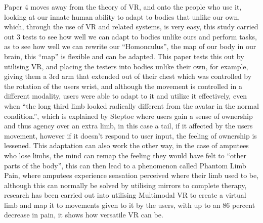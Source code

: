 \documentclass{scrartcl}
\begin{document}
Paper 4\cite{won2015homuncular} moves away from the theory of VR, and onto the people who use it, looking at our innate human ability to adapt to bodies that unlike our own, which, through the use of VR and related systems, is very easy, this study carried out 3 tests to see how well we can adapt to bodies unlike ours and perform tasks, as to see how well we can rewrite our ``Homonculus'', the map of our body in our brain, this ``map'' is flexible and can be adapted. This paper tests this out by utilising VR, and placing the testers into bodies unlike their own, for example, giving them a 3rd arm that extended out of their chest which was controlled by the rotation of the users wrist, and although the movement is controlled in a different modality, users were able to adapt to it and utilize it effectively, even when ``the long third limb looked radically different from the avatar in the normal condition.''\cite{won2015homuncular}, which is explained by Steptoe\cite{steptoe2013human} where users gain a sense of ownership and thus agency over an extra limb, in this case a tail, if it affected by the users movement, however if it doesn't respond to user input, the feeling of ownership is lessened. This adaptation can also work the other way, in the case of amputees who lose limbs, the mind can remap the feeling they would have felt to ``other parts of the body''\cite{won2015homuncular}, this can then lead to a phenomenon called Phantom Limb Pain, where amputees experience sensation perceived where their limb used to be, although this can normally be solved by utilising mirrors to complete therapy, research has been carried out into utilising Multimodal VR to create a virtual limb and map it to movements given to it by the users, with up to an 86 percent decrease in pain\cite{wake2015multimodal}, it shows how versatile VR can be.\\
\end{document}
